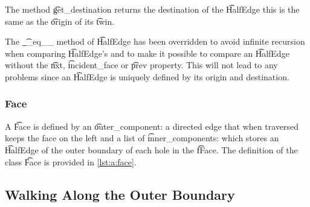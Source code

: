 	The method \t{get_destination} returns the destination of the \t{HalfEdge} this is the same as the \t{origin} of its \t{twin}.

	The \t{__eq__} method of \t{HalfEdge} has been overridden to avoid infinite recursion when comparing \t{HalfEdge}'s and to make it possible to compare an \t{HalfEdge} without the \t{nxt}, \t{incident_face} or \t{prev} property. This will not lead to any problems since an \t{HalfEdge} is uniquely defined by its origin and destination.
	

\subsubsection*{Face}
	A \t{Face} is defined by an \t{outer_component}: a directed edge that when traversed keeps the face on the left and a list of \t{inner_components}: which stores an \t{HalfEdge} of the outer boundary of each hole in the \t{fFace}. The definition of the class \t{Face} is provided in \autoref{lst:a:face}. 
	


\subsection{Walking Along the Outer Boundary}

% 
